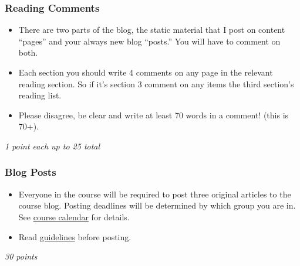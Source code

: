 \documentclass[
]{article}
\providecommand{\tightlist}{%
  \setlength{\itemsep}{0pt}\setlength{\parskip}{0pt}}
\begin{document}
\begin{assignment}

\hypertarget{reading-comments}{%
\subsubsection{Reading Comments}\label{reading-comments}}

\begin{itemize}
\tightlist
\item
  There are two parts of the blog, the static material that I post on
  content ``pages'' and your always new blog ``posts.'' You will have to
  comment on both.
\item
  Each section you should write 4 comments on any page in the relevant
  reading section. So if it's section 3 comment on any items the third
  section's reading list.
\item
  Please disagree, be clear and write at least 70 words in a comment!
  (this is 70+).
\end{itemize}

\emph{1 point each up to 25 total}

\end{assignment}

\begin{assignment}

\hypertarget{blog-posts}{%
\subsubsection{Blog Posts}\label{blog-posts}}

\begin{itemize}
\tightlist
\item
  Everyone in the course will be required to post three original
  articles to the course blog. Posting deadlines will be determined by
  which group you are in. See
  \href{http://www.6worlds.net/science-blog/science-or-superstition/assignments/}{course
  calendar} for details.
\item
  Read
  \href{https://www.6worlds.net/science-blog/science-or-superstition/chapter-1/1-1/welcome/}{guidelines}
  before posting.
\end{itemize}

\emph{30 points}

\end{assignment}
\end{document}
